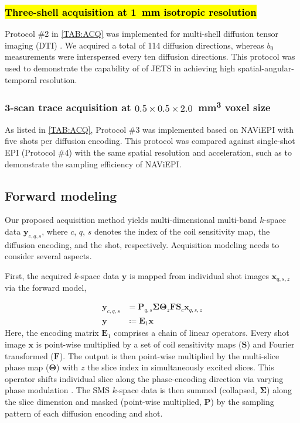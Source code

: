 \documentclass[preprint,12pt,authoryear,review]{elsarticle}
\begin{document}
    \subsubsection{\hl{Three-shell acquisition
    at \mbox{\SI{1}{\milli\meter}} isotropic resolution}}

    Protocol \#2 in \cref{TAB:ACQ} was implemented
    for multi-shell diffusion tensor imaging (DTI)
    \citep{basser_1994_dmri}.
    We acquired a total of 114 diffusion directions,
    whereas $b_0$ measurements were interspersed
    every ten diffusion directions.
    This protocol was used to demonstrate
    the capability of of JETS in achieving high
    spatial-angular-temporal resolution.


    \subsubsection{3-scan trace acquisition at $0.5\times0.5\times2.0$~\si{\cubic\milli\meter} voxel size}

    As listed in \cref{TAB:ACQ},
    Protocol \#3 was implemented based on
    NAViEPI with five shots per diffusion encoding.
    This protocol was compared against single-shot EPI (Protocol \#4)
    with the same spatial resolution and acceleration,
    such as to demonstrate the sampling efficiency of NAViEPI.


    \subsection{Forward modeling}
    Our proposed acquisition method yields
    multi-dimensional multi-band
    $k$-space data $\mathbf{y}_{c,q,s}$,
    where $c$, $q$, $s$ denotes the index of the coil sensitivity map,
    the diffusion encoding, and the shot, respectively.
    Acquisition modeling needs to consider several aspects.

    First, the acquired $k$-space data $\mathbf{y}$ is mapped from
    individual shot images $\mathbf{x}_{q,s,z}$ via the forward model,

    \begin{align}
        \mathbf{y}_{c,q,s} &= \mathbf{P}_{q,s} \mathbf{\Sigma} \mathbf{\Theta}_{z} \mathbf{F} \mathbf{S}_c \mathbf{x}_{q,s,z} \nonumber \\
        \mathbf{y} &\coloneqq \mathbf{E}_1 \mathbf{x} \label{EQU:model_shot}
    \end{align}
    Here, the encoding matrix $\mathbf{E}_1$ comprises
    a chain of linear operators.
    Every shot image $\mathbf{x}$ is point-wise multiplied
    by a set of coil sensitivity maps ($\mathbf{S}$) and Fourier transformed ($\mathbf{F}$).
    The output is then point-wise multiplied by the multi-slice phase map ($\mathbf{\Theta}$)
    with $z$ the slice index in simultaneously excited slices.
    This operator shifts individual slice
    along the phase-encoding direction
    via varying phase modulation \citep{breuer_2005_caipi}.
    The SMS $k$-space data is then
    summed (collapsed, $\mathbf{\Sigma}$) along the slice dimension and
    masked (point-wise multiplied, $\mathbf{P}$) by
    the sampling pattern of each diffusion encoding and shot.
\end{document}
